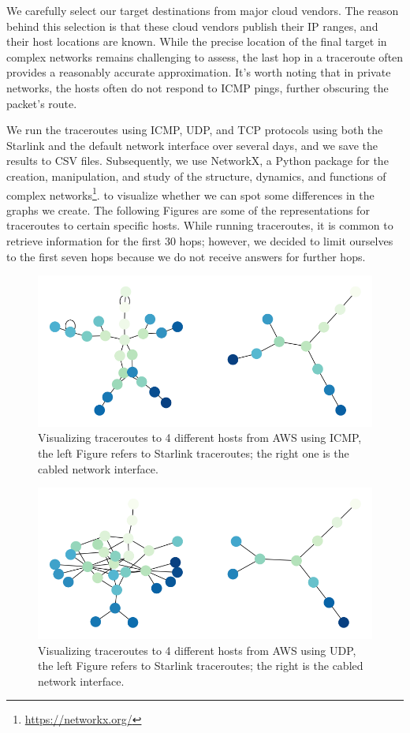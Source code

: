 \documentclass[IN,11pt,twoside,openright,idp,english]{tumthesis}
\begin{document}
We carefully select our target destinations from major cloud vendors. The reason behind this selection is that these cloud vendors publish their IP ranges, and their host locations are known. While the precise location of the final target in complex networks remains challenging to assess, the last hop in a traceroute often provides a reasonably accurate approximation. It's worth noting that in private networks, the hosts often do not respond to ICMP pings, further obscuring the packet's route.

We run the traceroutes using ICMP, UDP, and TCP protocols using both the Starlink and the default network interface over several days, and we save the results to CSV files. Subsequently, we use NetworkX, a Python package for the creation, manipulation, and study of the structure, dynamics, and functions of complex networks\footnote{\url{https://networkx.org/}}. to visualize whether we can spot some differences in the graphs we create. The following Figures are some of the representations for traceroutes to certain specific hosts. While running traceroutes, it is common to retrieve information for the first 30 hops; however, we decided to limit ourselves to the first seven hops because we do not receive answers for further hops. 

\begin{figure}
    \label{fig:tr_aws_icmp}
    \centering
    \includegraphics[width=0.6\columnwidth]{img/tr_aws_icmp.png}
    \caption{Visualizing traceroutes to 4 different hosts from AWS using ICMP, the left Figure refers to Starlink traceroutes; the right one is the cabled network interface.}
\end{figure}
    
\begin{figure}
    \label{fig:tr_aws_udp}
    \centering
    \includegraphics[width=0.6\columnwidth]{img/tr_aws_udp.png}
    \caption{Visualizing traceroutes to 4 different hosts from AWS using UDP, the left Figure refers to Starlink traceroutes; the right is the cabled network interface.}
\end{figure}
    
\end{document}
